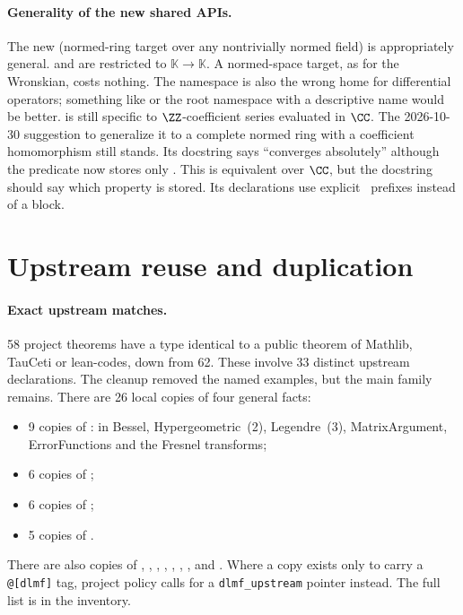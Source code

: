 \documentclass[11pt,a4paper]{article}
\begin{document}
\paragraph{Generality of the new shared APIs.}
The new  (normed-ring target over any nontrivially normed field) is
appropriately general.  and  are
restricted to $\mathbb{K}\to\mathbb{K}$. A normed-space target, as for the Wronskian, costs
nothing. The namespace  is also the wrong home for differential operators;
something like  or the root namespace with a descriptive name would be better.
 is still specific to $\ZZ$-coefficient series evaluated in
$\CC$. The 2026-10-30 suggestion to generalize it to a complete normed ring with a coefficient
homomorphism still stands. Its docstring says ``converges absolutely'' although the predicate
now stores only . This is equivalent over $\CC$, but the docstring should say
which property is stored. Its declarations use explicit \ prefixes instead
of a  block.

\section{Upstream reuse and duplication}

\paragraph{Exact upstream matches.}
58 project theorems have a type identical to a public theorem of Mathlib, TauCeti or
lean-codes, down from 62. These involve 33 distinct upstream declarations. The cleanup
removed the named examples, but the main family remains. There are 26 local copies of four
general facts:
\begin{itemize}
  \item 9 copies of : in Bessel, Hypergeometric~(2), Legendre~(3),
    MatrixArgument, ErrorFunctions and the Fresnel transforms;
  \item 6 copies of ;
  \item 6 copies of ;
  \item 5 copies of .
\end{itemize}
There are also copies of , ,
, , ,
, ,
 and . Where a copy exists
only to carry a \texttt{@[dlmf]} tag, project policy calls for a \texttt{dlmf\_upstream}
pointer instead. The full list is in the inventory.
\end{document}
